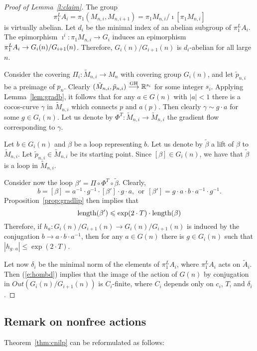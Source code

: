 \documentclass{amsart}
\begin{document}
\begin{proof} [Proof of Lemma~\ref{l:claim}]

The group
$$\pi_1^LA_i=\pi_1(M_{n,i},M_{n,i+1})=\pi_1M_{n,i}/\imath[\pi_1M_{n,i}]$$
is virtually abelian.
Let $d_i$ be the minimal index of an abelian subgroup of $\pi_1^LA_i$.
The epimorphism
$\imath^i\colon \pi_1M_{n,i}\to G_i$
induces an  epimorphism $\pi_1^LA_i\z\to G_i(n)/G_{i+1}(n)$.
Therefore, $G_i(n)/G_{i+1}(n)$ is $d_i$-abelian for all large $n$.


Consider the covering
$\Pi_i\colon \tilde M_{n,i}\to M_n$ with covering group $G_i(n)$,
and let $\tilde p_{n,i}$ be a preimage of $p_n$.
Clearly $(\tilde M_{n,i},\tilde p_{n,i})\GHto {\Bbb R}^{s_i}$
for some integer $s_i$.
Applying Lemma~\ref{lem:gradb},
it follows  that for any $a\in G(n)$ with $|a|<1$ there is
a cocos-curve $\gamma$ in $\tilde M_{n,i}$ which connects $p$ and $a(p)$.
Then clearly $\gamma\sim g\cdot a$ for some $g\in G_i(n)$.
Let us denote by $\Phi^T\colon  \tilde M_{n,i}\to \tilde M_{n,i}$
the gradient flow corresponding  to $\gamma$.

Let $b\in G_i(n)$ and $\beta$ be a loop  representing $b$.
Let us denote by  $\tilde\beta$ a lift of $\beta$ to $\tilde M_{n,i}$.
Let $\tilde p_{n,i}\in \tilde M_{n,i}$ be its starting point.
Since $[\beta]\in G_i(n)$,
we have that $\tilde\beta$ is a loop in $\tilde M_{n,i}$.

Consider now the loop
$\beta'=\Pi\circ\Phi^T\circ\tilde\beta$. Clearly,
$$b=[\beta]=a^{-1}\cdot g^{-1}\cdot [\beta']\cdot g\cdot a , \ \ \text{or}\ \ [\beta']=g\cdot a\cdot b\cdot a^{-1}\cdot g^{-1}.$$
Proposition~\ref{prop:gradlip}  then implies that
\begin{equation*}\label{e:1}\operatorname{\rm length}(\beta')\leqslant \exp(2\cdot T)\cdot\operatorname{\rm length}(\beta)
\end{equation*}
Therefore, if $h_a\colon G_i(n)/G_{i+1}(n)\to G_i(n)/G_{i+1}(n)$
is induced by the conjugation $b\to a\cdot b\cdot a ^{-1}$,
then for any $a\in G(n)$ there is $g\in G_i(n)$ such that $|h_{g\cdot a}|\le \exp(2\cdot T)$.

Let now $\delta_i$ be the minimal norm of the elements of $\pi_1^LA_i$,
where $\pi_1^LA_i$ acts on $\tilde A_i$.
Then (\ref{e:hombd})  implies that the image of the
action of $G(n)$ by conjugation in $Out(G_i(n)/G_{i+1}(n))$ is $C_i$-finite,
where  $C_i$ depends only on $c_i$, $T$,
and $\delta_i$.
\end{proof}

\subsection{Remark on nonfree actions}\label{rem:nonfree}
Theorem~\ref{thm:cnilp} can be reformulated as follows:
\end{document}
